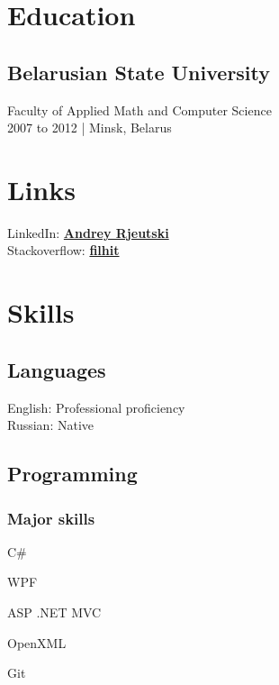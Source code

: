 \documentclass[a4paper,11pt]{article}
\newcommand{\periodandlocation}[1]{{\small #1}}
\newcommand{\minsk}{Minsk, Belarus}
\begin{document}
  \vspace{1cm}
  \begin{minipage}[t]{0.34\textwidth}
    \section*{Education} 
    \subsection*{Belarusian State University}
    Faculty of Applied Math and Computer Science\\
	\periodandlocation{2007 to 2012 | \minsk}
    \section*{Links} 
    LinkedIn: \href{https://linkedin.com/in/andrey-rjeutski-92064741}{\bf Andrey Rjeutski} \\
    Stackoverflow: \href{http://stackoverflow.com/users/3506292/filhit}{\bf filhit}
    \section*{Skills}
	\subsection*{Languages}
    English: Professional proficiency\\
    Russian: Native
    \subsection*{Programming}
    \subsubsection*{Major skills}
	\begin{inparaitem}
      \item C\# 
	  \item WPF
	  \item ASP .NET MVC
	  \item OpenXML
	  \item Git
	\end{inparaitem}

\end{minipage}
\end{document}
